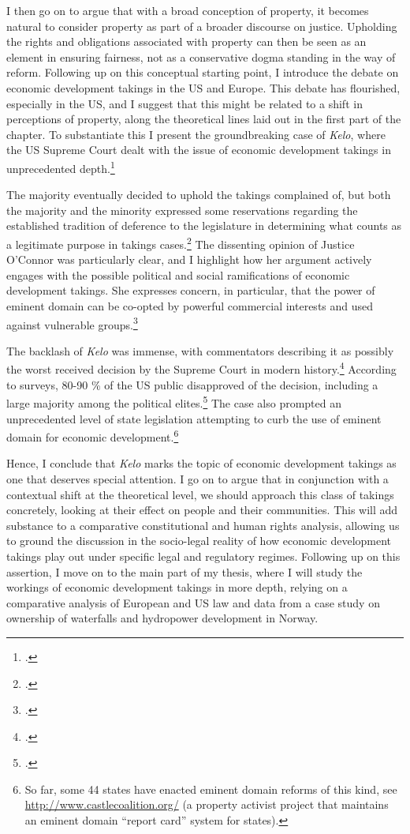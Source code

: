 \documentclass[12pt,a4paper]{article} %
\begin{document}
I then go on to argue that with a broad conception of property, it becomes natural to consider property as part of a broader discourse on justice. Upholding the rights and obligations associated with property can then be seen as an element in ensuring fairness, not as a conservative dogma standing in the way of reform. Following up on this conceptual starting point, I introduce the debate on  economic development takings in the US and Europe. This debate has flourished, especially in the US, and I suggest that this might be related to a shift in perceptions of property, along the theoretical lines laid out in the first part of the chapter. To substantiate this I present the groundbreaking case of {\it Kelo}, where the US Supreme Court dealt with the issue of economic development takings in unprecedented depth.\footcite{kelo05}

The majority eventually decided to uphold the takings complained of, but both the majority and the minority expressed some reservations regarding the established tradition of deference to the legislature in determining what counts as a legitimate purpose in takings cases.\footcite[563-565]{thomas09} The dissenting opinion of Justice O'Connor was particularly clear, and I highlight how her argument actively engages with the possible political and social ramifications of economic development takings. She expresses concern, in particular, that the power of eminent domain can be co-opted by powerful commercial interests and used against vulnerable groups.\footcite[505]{kelo05}

The backlash of {\it Kelo} was immense, with commentators describing it as possibly the worst received decision by the Supreme Court in modern history.\footcite{somin07} According to surveys, 80-90 \% of the US public disapproved of the decision, including a large majority among the political elites.\footcite{somin09} The case also prompted an unprecedented level of state legislation attempting to curb the use of eminent domain for economic development.\footnote{So far, some 44 states have enacted eminent domain reforms of this kind, see \url{http://www.castlecoalition.org/} (a property activist project that maintains an eminent domain ``report card'' system for states).}

Hence, I conclude that {\it Kelo} marks the topic of economic development takings as one that deserves special attention. I go on to argue that in conjunction with a contextual shift at the theoretical level, we should approach this class of takings concretely, looking at their effect on people and their communities. This will add substance to a comparative constitutional and human rights analysis, allowing us to ground the discussion in the socio-legal reality of how economic development takings play out under specific legal and regulatory regimes. Following up on this assertion, I move on to the main part of my thesis, where I will study the workings of economic development takings in more depth, relying on a comparative analysis of European and US law and data from a case study on ownership of waterfalls and hydropower development in Norway. \\
\end{document}
